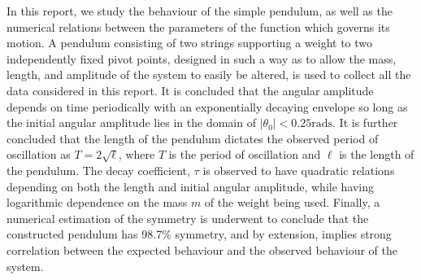 In this report, we study the behaviour of the simple pendulum, as well as the numerical relations between the parameters of the function which governs its motion. A pendulum consisting of two strings supporting a weight to two independently fixed pivot points,  designed in such a way as to allow the mass, length, and amplitude of the system to easily be altered, is used to collect all the data considered in this report. It is concluded that the angular amplitude depends on time periodically with an exponentially decaying envelope so long as the initial angular amplitude lies in the domain of $|\theta_0| < 0.25\text{rads}$. It is further concluded that the length of the pendulum dictates the observed period of oscillation as $T = 2\sqrt{\ell}$, where $T$ is the period of oscillation and $\ell$ is the length of the pendulum. The decay coefficient, $\tau$ is observed to have quadratic relations depending on both the length and initial angular amplitude, while having logarithmic dependence on the mass $m$ of the weight being used. Finally, a numerical estimation of the symmetry is underwent to conclude that the constructed pendulum has 98.7\% symmetry, and by extension, implies strong correlation between the expected behaviour and the observed behaviour of the system.
